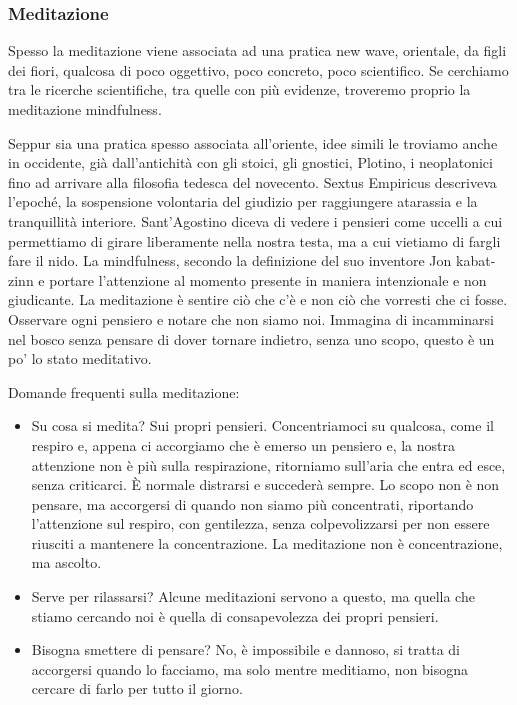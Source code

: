 \documentclass[12pt]{book} %
\begin{document}
\subsubsection{Meditazione}
Spesso la meditazione viene associata ad una pratica new wave, orientale, da figli dei fiori, qualcosa di poco oggettivo, poco concreto, poco scientifico. Se cerchiamo tra le ricerche scientifiche, tra quelle con più evidenze, troveremo proprio la meditazione mindfulness.

Seppur sia una pratica spesso associata all'oriente, idee simili le troviamo anche in occidente, già dall'antichità con gli stoici, gli
gnostici, Plotino, i neoplatonici fino ad arrivare alla filosofia tedesca del novecento. Sextus Empiricus descriveva l’epoché, la sospensione volontaria del giudizio per raggiungere atarassia e la tranquillità interiore. Sant'Agostino diceva di vedere i pensieri come uccelli a cui
permettiamo di girare liberamente nella nostra testa, ma a cui vietiamo di fargli fare il nido. La mindfulness, secondo la definizione del suo inventore Jon kabat-zinn e portare l'attenzione al momento presente in maniera intenzionale e non giudicante.
La meditazione è sentire ciò che c'è e non ciò che vorresti che ci fosse. Osservare ogni pensiero e notare che non siamo noi.
Immagina di incamminarsi nel bosco senza pensare di dover tornare indietro, senza uno scopo, questo è un po' lo stato meditativo.

Domande frequenti sulla meditazione: 
\begin{itemize}
\item Su cosa si medita? Sui propri pensieri. Concentriamoci su qualcosa, come il respiro e, appena ci accorgiamo che è emerso un pensiero e, la nostra attenzione non è più sulla respirazione, ritorniamo sull'aria che entra ed esce, senza criticarci. È normale distrarsi e succederà sempre. Lo scopo non è non pensare, ma accorgersi di quando non siamo più concentrati, riportando l'attenzione sul respiro, con gentilezza, senza colpevolizzarsi per non essere riusciti a mantenere la concentrazione. La meditazione non è concentrazione, ma ascolto.
\item Serve per rilassarsi? Alcune meditazioni servono a questo, ma quella che stiamo cercando noi è quella di consapevolezza dei propri pensieri.
\item Bisogna smettere di pensare? No, è impossibile e dannoso, si tratta di accorgersi quando lo facciamo, ma solo mentre meditiamo, non bisogna cercare di farlo per tutto il giorno.
\end{itemize}
\end{document}

